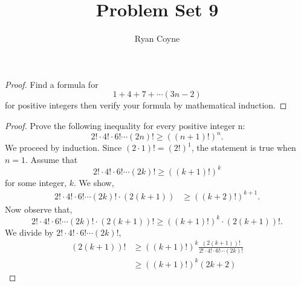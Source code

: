 \documentclass[12pt]{article}
\begin{document}
    \title{Problem Set 9}
    \author{Ryan Coyne}
    \maketitle

    \noindent\begin{proof}{Find a formula for \begin{equation*}
        1+4+7+ \cdots (3n-2)
    \end{equation*}
    for positive integers then verify your formula by mathematical induction.}

    \end{proof}
    \begin{proof}{Prove the following inequality for every positive integer n:\begin{equation*}
        2!\cdot4!\cdot6!\cdots(2n)!\geq((n+1)!)^n.
    \end{equation*}}
        We proceed by induction. Since \((2\cdot1)!=(2!)^1\), the statement is true when \(n=1\). Assume that
        \begin{equation*}
            2!\cdot4!\cdot6!\cdots(2k)!\geq((k+1)!)^k
        \end{equation*}
        for some integer, \(k\). We show,
        \begin{equation*}
            \begin{split}
                2!\cdot4!\cdot6!\cdots(2k)!\cdot(2(k+1))&\geq((k+2)!)^{k+1}.
            \end{split}
        \end{equation*}
        Now observe that,
        \begin{equation*}
            2!\cdot4!\cdot6!\cdots(2k)!\cdot(2(k+1))!\geq((k+1)!)^k\cdot(2(k+1))!.
        \end{equation*}
        We divide by \(2!\cdot4!\cdot6!\cdots(2k)!\),
        \begin{equation*}
            \begin{split}
                (2(k+1))!&\geq((k+1)!)^k\frac{(2(k+1))!}{2!\cdot4!\cdot6!\cdots(2k)!}\\
                &\geq((k+1)!)^k(2k+2)
            \end{split}
        \end{equation*}
    \end{proof}
\end{document}
